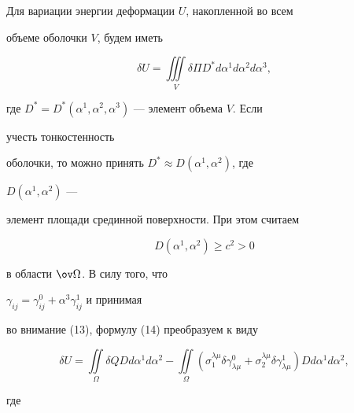  


Для вариации энергии деформации $U$, накопленной во всем 


объеме оболочки $V$, будем иметь 


\begin{equation} 


\delta U=\iiint\limits_V \delta\Pi D^*d\alpha^1d\alpha^2d\alpha^3, 


\end{equation} 


где $D^*=D^*(\alpha^1,\alpha^2,\alpha^3)$ --- элемент объема $V$. Если 


учесть тонкостенность  


оболочки, то можно принять $D^*\approx D(\alpha^1,\alpha^2)$, где 


$D(\alpha^1,\alpha^2)$ --- 


элемент площади срединной поверхности. При этом считаем 


\begin{equation} 


D(\alpha^1,\alpha^2)\ge c^2>0 


\end{equation} 


в области $\ov\Omega$. В силу того, что 


$\gamma_{ij}=\gamma^0_{ij}+\alpha^3\gamma^1_{ij}$ и принимая 


во внимание (13), формулу (14) преобразуем к виду 


\begin{equation} 


\delta U=\iint\limits_\Omega \delta Q D d\alpha^1d\alpha^2- 


\iint\limits_\Omega(\sigma^{\lambda\mu}_1\delta\gamma^0_{\lambda\mu}+ 


\sigma^{\lambda\mu}_2\delta\gamma^1_{\lambda\mu}) 


D d\alpha^1d\alpha^2, 


\end{equation} 


где 


